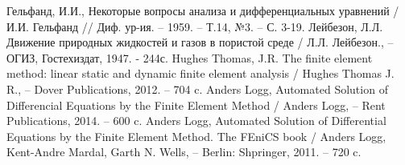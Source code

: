 \begin{center}
\end{center}

\renewcommand\refname{}
\begin{thebibliography}{9}
        Гельфанд, И.И.,
        {Некоторые вопросы анализа и дифференциальных уравнений} /
        И.И. Гельфанд  // Диф. ур-ия. -- 1959. -- Т.14, №3. -- С. 3-19.
        Лейбезон, Л.Л.
        {Движение природных жидкостей и газов в пористой среде} /
        Л.Л. Лейбезон., -- ОГИЗ, Гостехиздат, 1947. - 244с.
        Hughes Thomas, J.R.
        {The finite element method: linear static and dynamic finite element analysis} /
        Hughes Thomas J. R., -- Dover Publications, 2012. -- 704 c.
        Anders Logg,
        {Automated Solution of Differencial Equations by the Finite Element Method} /
        Anders Logg, -- Rent Publications, 2014. -- 600 c.
        Anders Logg,
        {Automated Solution of Differential Equations by the Finite Element Method. The FEniCS book} /
        Anders Logg, Kent-Andre Mardal, Garth N. Wells, -- Berlin: Shpringer, 2011. -- 720 c.
\end{thebibliography}
